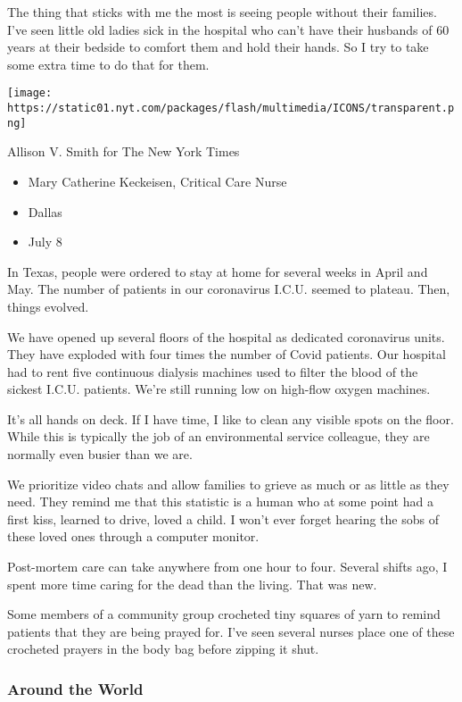 The thing that sticks with me the most is seeing people without their
families. I've seen little old ladies sick in the hospital who can't
have their husbands of 60 years at their bedside to comfort them and
hold their hands. So I try to take some extra time to do that for them.

\texttt{[image: https://static01.nyt.com/packages/flash/multimedia/ICONS/transparent.png]}

Allison V. Smith for The New York Times

\begin{itemize}
\tightlist
\item
  Mary Catherine Keckeisen, Critical Care Nurse
\item
  Dallas
\item
  July 8
\end{itemize}

In Texas, people were ordered to stay at home for several weeks in April
and May. The number of patients in our coronavirus I.C.U. seemed to
plateau. Then, things evolved.

We have opened up several floors of the hospital as dedicated
coronavirus units. They have exploded with four times the number of
Covid patients. Our hospital had to rent five continuous dialysis
machines used to filter the blood of the sickest I.C.U. patients. We're
still running low on high-flow oxygen machines.

It's all hands on deck. If I have time, I like to clean any visible
spots on the floor. While this is typically the job of an environmental
service colleague, they are normally even busier than we are.

We prioritize video chats and allow families to grieve as much or as
little as they need. They remind me that this statistic is a human who
at some point had a first kiss, learned to drive, loved a child. I won't
ever forget hearing the sobs of these loved ones through a computer
monitor.

Post-mortem care can take anywhere from one hour to four. Several shifts
ago, I spent more time caring for the dead than the living. That was
new.

Some members of a community group crocheted tiny squares of yarn to
remind patients that they are being prayed for. I've seen several nurses
place one of these crocheted prayers in the body bag before zipping it
shut.

\hypertarget{around-the-world-1}{%
\subsubsection{Around the World}\label{around-the-world-1}}

